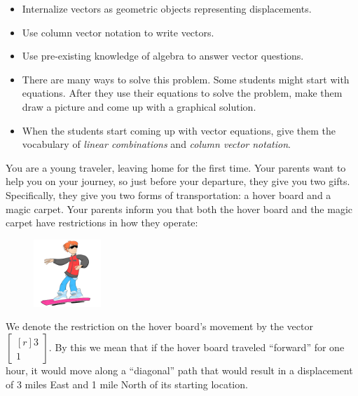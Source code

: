 \documentclass{problemset}
\newcommand{\mat}[1]{\begin{bmatrix*}[r]#1\end{bmatrix*}}
\begin{document}
\begin{annotation}
	\begin{goals}
		\begin{itemize}
			\item Internalize vectors as geometric objects representing
				displacements.

			\item Use column vector notation to write vectors.

			\item Use pre-existing knowledge of algebra to answer vector
				questions.
		\end{itemize}
	\end{goals}
	\begin{notes}

		\begin{itemize}
			\item There are many ways to solve this problem.
				Some students
				might start with equations. After they use their
				equations to solve the problem, make them draw a picture
				and come up with a graphical solution.

			\item When the students start coming up with vector equations,
				give them the vocabulary of \emph{linear
				combinations}
				and \emph{column vector notation}.
		\end{itemize}
	\end{notes}
\end{annotation}
You are a young traveler, leaving home for the first time. Your parents
want to help you on your journey, so just before your departure, they give you two
gifts. Specifically, they give you two forms of transportation: a hover board and
a magic carpet. Your parents inform you that both the hover board and the magic carpet
have restrictions in how they operate: 

\begin{minipage}{\textwidth}
	\vspace{.5cm}
	\begin{figure}
	\vspace{-.8cm}
	\includegraphics[width=1in]{images/HoverBoard-small.png}
	\end{figure}

	We denote the restriction on the hover board's movement by the vector
	$\mat{3 \\1}$. By this we mean that if
	the hover board traveled ``forward'' for one hour, it would move along a
	``diagonal'' path that would result in a displacement of 3 miles East and
	1 mile North of its starting location.
\end{minipage}
\end{document}
